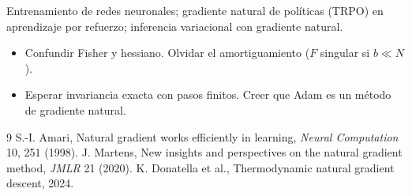 \documentclass[11pt,a4paper]{article}
\begin{document}
\begin{aplicacion}
Entrenamiento de redes neuronales; gradiente natural de políticas (TRPO) en aprendizaje por refuerzo; inferencia variacional con gradiente natural.
\end{aplicacion}

\begin{error}
\begin{itemize}[nosep]
\item Confundir Fisher y hessiano. \quad Olvidar el amortiguamiento ($F$ singular si $b\ll N$).
\item Esperar invariancia exacta con pasos finitos. \quad Creer que Adam es un método de gradiente natural.
\end{itemize}
\end{error}

\begin{thebibliography}{9}\small
{} S.-I. Amari, Natural gradient works efficiently in learning, \emph{Neural Computation} 10, 251 (1998).
 J. Martens, New insights and perspectives on the natural gradient method, \emph{JMLR} 21 (2020).
 K. Donatella et al., Thermodynamic natural gradient descent, 2024.
\end{thebibliography}
\end{document}

